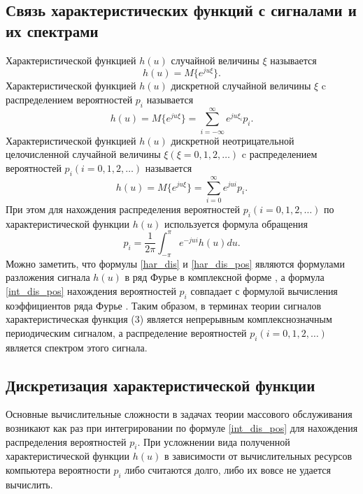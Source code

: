 \subsection{Связь характеристических функций с сигналами и их спектрами}

Характеристической функцией $h(u)$ случайной величины $\xi$ называется
\begin{equation}\label{har}
	h(u)=M\{e^{ju\xi}\}.
\end{equation}
Характеристической функцией $h(u)$ дискретной случайной величины $\xi$ c распределением вероятностей $p_i$ называется
\begin{equation}\label{har_dis}
	h(u)=M\{e^{ju\xi}\}=\sum_{i=-\infty}^{\infty}e^{ju\xi_i}p_i.
\end{equation}
Характеристической функцией $h(u)$ дискретной неотрицательной целочисленной случайной величины $\xi (\xi=0,1,2,\dots)$ c распределением вероятностей $p_i (i=0,1,2,\dots)$ называется
\begin{equation}\label{har_dis_pos}
	h(u)=M\{e^{ju\xi}\}=\sum_{i=0}^{\infty}e^{jui}p_i.
\end{equation}
При этом для нахождения распределения вероятностей $p_i (i=0,1,2,\dots)$ по характеристической функции $h(u)$ используется формула обращения
\begin{equation}\label{int_dis_pos}
	p_i=\frac{1}{2\pi}\int_{-\pi}^{\pi}e^{-jui}h(u)du.
\end{equation}
Можно заметить, что формулы \eqref{har_dis} и \eqref{har_dis_pos} являются формулами разложения сигнала $h(u)$ в ряд Фурье в комплексной форме \cite{долгополов2011ряды}, а формула \eqref{int_dis_pos} нахождения вероятностей $p_i$ совпадает с формулой вычисления коэффициентов ряда Фурье \cite{долгополов2011ряды}. Таким образом, в терминах теории сигналов характеристическая функция (3) является непрерывным комплекснозначным периодическим сигналом, а распределение вероятностей $p_i (i=0,1,2,\dots)$ является спектром этого сигнала.
\subsection{Дискретизация характеристической функции}
Основные вычислительные сложности в задачах теории массового обслуживания возникают как раз при интегрировании по формуле \eqref{int_dis_pos} для нахождения распределения вероятностей $p_i$. При усложнении вида полученной характеристической функции $h(u)$ в зависимости от вычислительных ресурсов компьютера вероятности $p_i$ либо считаются долго, либо их вовсе не удается вычислить.

